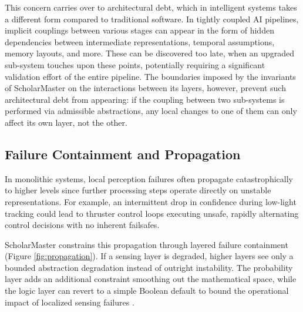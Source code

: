 \documentclass[conference]{IEEEtran}
\begin{document}
This concern carries over to architectural debt, which in intelligent systems takes a different form compared to traditional software. In tightly coupled AI pipelines, implicit couplings between various stages can appear in the form of hidden dependencies between intermediate representations, temporal assumptions, memory layouts, and more. These can be discovered too late, when an upgraded sub-system touches upon these points, potentially requiring a significant validation effort of the entire pipeline. The boundaries imposed by the invariants of ScholarMaster on the interactions between its layers, however, prevent such architectural debt from appearing: if the coupling between two sub-systems is performed via admissible abstractions, any local changes to one of them can only affect its own layer, not the other.

\subsection{Failure Containment and Propagation}
In monolithic systems, local perception failures often propagate catastrophically to higher levels since further processing steps operate directly on unstable representations. For example, an intermittent drop in confidence during low-light tracking could lead to thruster control loops executing unsafe, rapidly alternating control decisions with no inherent failsafes.

ScholarMaster constrains this propagation through layered failure containment (Figure \ref{fig:propagation}). If a sensing layer is degraded, higher layers see only a bounded abstraction degradation instead of outright instability. The probability layer adds an additional constraint smoothing out the mathematical space, while the logic layer can revert to a simple Boolean default to bound the operational impact of localized sensing failures \cite{b20}.
\end{document}
